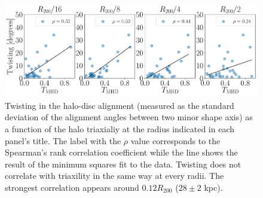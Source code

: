 \documentclass[usenatbib]{mnras}
\begin{document}
\begin{figure}
\begin{center}
\includegraphics[width=1.0\textwidth]{correlations_twisting_triaxiality_MHD.pdf}
\end{center}
\caption{Twisting in the halo-disc alignment (measured as the standard deviation
  of the alignment angles between two minor shape axis)
  as a function of the halo triaxialiy at the radius indicated
  in each panel's title.
  The label with the $\rho$ value corresponds to the Spearman's rank
  correlation coefficient while the line shows the result of the
  minimum squares fit to the data.
  Twisting does not correlate with triaxility in the same way at every
  radii. The strongest correlation appears around $0.12R_{200}$ ($28\pm2$ kpc).} 
\label{fig:alignment_correlations}
\end{figure}
\end{document}
